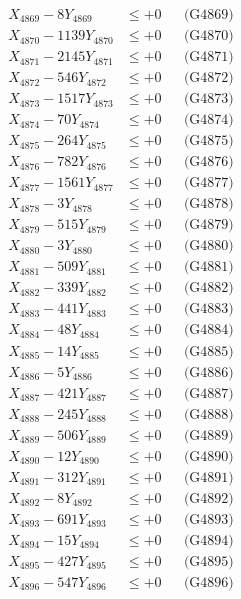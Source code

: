 \documentclass[a4paper,10pt]{article}
\begin{document}
{\begin{align}
X_{4869} - 8Y_{4869} &\leq +0 && \text{(G4869)} \\
X_{4870} - 1139Y_{4870} &\leq +0 && \text{(G4870)} \\
\allowbreak
X_{4871} - 2145Y_{4871} &\leq +0 && \text{(G4871)} \\
X_{4872} - 546Y_{4872} &\leq +0 && \text{(G4872)} \\
X_{4873} - 1517Y_{4873} &\leq +0 && \text{(G4873)} \\
X_{4874} - 70Y_{4874} &\leq +0 && \text{(G4874)} \\
X_{4875} - 264Y_{4875} &\leq +0 && \text{(G4875)} \\
X_{4876} - 782Y_{4876} &\leq +0 && \text{(G4876)} \\
X_{4877} - 1561Y_{4877} &\leq +0 && \text{(G4877)} \\
X_{4878} - 3Y_{4878} &\leq +0 && \text{(G4878)} \\
X_{4879} - 515Y_{4879} &\leq +0 && \text{(G4879)} \\
X_{4880} - 3Y_{4880} &\leq +0 && \text{(G4880)} \\
\allowbreak
X_{4881} - 509Y_{4881} &\leq +0 && \text{(G4881)} \\
X_{4882} - 339Y_{4882} &\leq +0 && \text{(G4882)} \\
X_{4883} - 441Y_{4883} &\leq +0 && \text{(G4883)} \\
X_{4884} - 48Y_{4884} &\leq +0 && \text{(G4884)} \\
X_{4885} - 14Y_{4885} &\leq +0 && \text{(G4885)} \\
X_{4886} - 5Y_{4886} &\leq +0 && \text{(G4886)} \\
X_{4887} - 421Y_{4887} &\leq +0 && \text{(G4887)} \\
X_{4888} - 245Y_{4888} &\leq +0 && \text{(G4888)} \\
X_{4889} - 506Y_{4889} &\leq +0 && \text{(G4889)} \\
X_{4890} - 12Y_{4890} &\leq +0 && \text{(G4890)} \\
\allowbreak
X_{4891} - 312Y_{4891} &\leq +0 && \text{(G4891)} \\
X_{4892} - 8Y_{4892} &\leq +0 && \text{(G4892)} \\
X_{4893} - 691Y_{4893} &\leq +0 && \text{(G4893)} \\
X_{4894} - 15Y_{4894} &\leq +0 && \text{(G4894)} \\
X_{4895} - 427Y_{4895} &\leq +0 && \text{(G4895)} \\
X_{4896} - 547Y_{4896} &\leq +0 && \text{(G4896)} \\

\end{align}}
\end{document}
